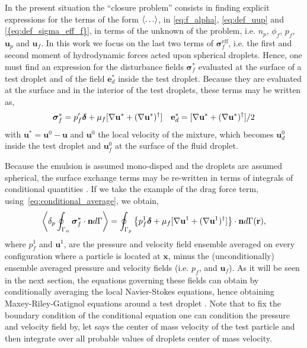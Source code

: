 In the present situation the ``closure problem'' consists in finding explicit expressions for the terms of the form $\avg{\ldots}$, in \ref{eq:f_alpha}, \ref{eq:def_uup} and \ref{{eq:def_sigma_eff_f}}, in terms of the unknown of the problem, i.e. $n_p$, $\phi_f$, $p_f$, $\textbf{u}_p$ and $\textbf{u}_f$. 
In this work we focus on the last two terms of $\bm\sigma^\text{eff}_f$, i.e. the first and second moment of hydrodynamic forces acted upon spherical droplets.
Hence, one must find an expression for the disturbance fields $\bm\sigma_f^*$ evaluated at the surface of a test droplet and of the field $\textbf{e}_d^*$ inside the test droplet. 
Because they are evaluated at the surface and in the interior of the test droplets, these terms may be written as, 
\begin{align}
    \bm\sigma_f^* =p_f' \bm\delta 
    + \mu_f [\grad \textbf{u}^* + (\grad \textbf{u}^*)^\dagger]
    && 
    \textbf{e}_d^* = [\grad \textbf{u}^* + (\grad \textbf{u}^*)^\dagger] /2
    \label{eq:conditional_average}
\end{align}
with $\textbf{u}^* = \textbf{u}^0 - \textbf{u}$ and $\textbf{u}^0$ the local velocity of the mixture, which becomes $\textbf{u}_d^0$ inside the test droplet and $\textbf{u}_f^0$ at the surface of the fluid droplet. 

Because the emulsion is assumed mono-disped and the droplets are assumed spherical, the surface exchange terms may be re-written in terms of integrals of conditional quantities \citep{lhuillier1992ensemble}. 
If we take the example of the drag force term, using~\ref{eq:conditional_average}, we obtain, 
\begin{equation}
    \pSavg{\bm\sigma^*_f\cdot \textbf{n}}
    =
    \intS[p]{
        \left\{
            p_f^1 \bm\delta 
    + \mu_f [\grad \textbf{u}^1 + (\grad \textbf{u}^1)^\dagger]
        \right\}\cdot \textbf{n}
    }(\textbf{r}),
\end{equation}
where $p_f^1$ and $\textbf{u}^1$, are the pressure and velocity field ensemble averaged on every configuration where a particle is located at $\textbf{x}$, minus the (unconditionally) ensemble averaged  pressure and velocity fields (i.e. $p_f$, and $\textbf{u}_f$).
As it will be seen in the next section, the equations governing these fields can obtain by conditionally averaging the local Navier-Stokes equations, hence obtaining Maxey-Riley-Gatignol equations around a test droplet \citep{fintzi2025}. 
Note that to fix the boundary condition of the conditional equation one can condition the pressure and velocity field by, let says the center of mass velocity of the test particle and then integrate over all probable values of droplets center of mass velocity. 


